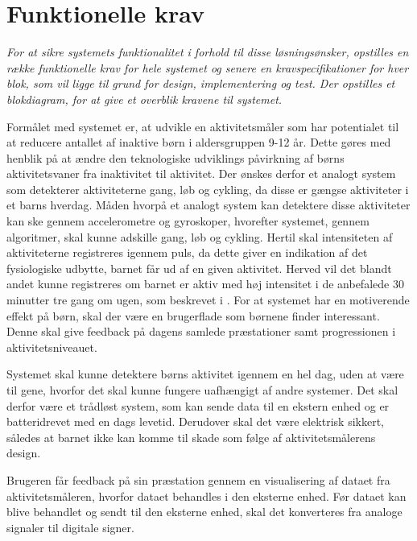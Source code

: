\section{Funktionelle krav}\label{funktionellekrav}
\textit{For at sikre systemets funktionalitet i forhold til disse løsningsønsker, opstilles en række funktionelle krav for hele systemet og senere en kravspecifikationer for hver blok, som vil ligge til grund for design, implementering og test. Der opstilles et blokdiagram, for at give et overblik kravene til systemet.}

Formålet med systemet er, at udvikle en aktivitetsmåler som har potentialet til at reducere antallet af inaktive børn i aldersgruppen 9-12 år. Dette gøres med henblik på at ændre den teknologiske udviklings påvirkning af børns aktivitetsvaner fra inaktivitet til aktivitet.
Der ønskes derfor et analogt system som detekterer aktiviteterne gang, løb og cykling, da disse er gængse aktiviteter i et barns hverdag. Måden hvorpå et analogt system kan detektere disse aktiviteter kan ske gennem accelerometre og gyroskoper, hvorefter systemet, gennem algoritmer, skal kunne adskille gang, løb og cykling.
Hertil skal intensiteten af aktiviteterne registreres igennem puls, da dette giver en indikation af det fysiologiske udbytte, barnet får ud af en given aktivitet. Herved vil det blandt andet kunne registreres om barnet er aktiv med høj intensitet i de anbefalede 30 minutter tre gang om ugen, som beskrevet i . \newline
For at systemet har en motiverende effekt på børn, skal der være en brugerflade som børnene finder interessant. Denne skal give feedback på dagens samlede præstationer samt progressionen i aktivitetsniveauet.

Systemet skal kunne detektere børns aktivitet igennem en hel dag, uden at være til gene, hvorfor det skal kunne fungere uafhængigt af andre systemer. Det skal derfor være et trådløst system, som kan sende data til en ekstern enhed og er batteridrevet med en dags levetid. Derudover skal det være elektrisk sikkert, således at barnet ikke kan komme til skade som følge af aktivitetsmålerens design. 

Brugeren får feedback på sin præstation gennem en visualisering af dataet fra aktivitetsmåleren, hvorfor dataet behandles i den eksterne enhed. \newline
Før dataet kan blive behandlet og sendt til den eksterne enhed, skal det konverteres fra analoge signaler til digitale signer. 

